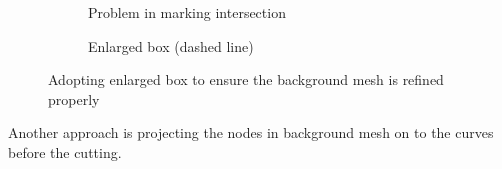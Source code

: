 \begin{figure}
    \begin{subfigure}[b]{0.5\linewidth}
        \centering
        \caption{Problem in marking intersection}
        \label{qdt_fig:qdt_cutting_point_moving_problem}
    \end{subfigure}
    \begin{subfigure}[b]{0.5\linewidth}
        \centering
        \caption{Enlarged box (dashed line)}
        \label{qdt_fig:qdt_cutting_enlarged_box}
    \end{subfigure}
    \caption[Problem in marking intersection]{Adopting enlarged box to ensure the background mesh is refined properly}
    \label{qdt_fig:qdt_cutting_enlarged_box_point_moving_problem}
\end{figure}
Another approach is projecting the nodes in background mesh on to the curves before the cutting.

